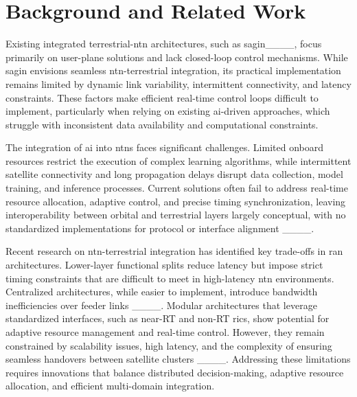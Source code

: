 \section{Background and Related Work}
\label{sec:background}

Existing integrated terrestrial-\gls{ntn} architectures, such as \gls{sagin}____, focus primarily on user-plane solutions and lack closed-loop control mechanisms. While \gls{sagin} envisions seamless \gls{ntn}-terrestrial integration, its practical implementation remains limited by dynamic link variability, intermittent connectivity, and latency constraints. These factors make efficient real-time control loops difficult to implement, particularly when relying on existing \gls{ai}-driven approaches, which struggle with inconsistent data availability and computational constraints.

The integration of \gls{ai} into \glspl{ntn} faces significant challenges. Limited onboard resources restrict the execution of complex learning algorithms, while intermittent satellite connectivity and long propagation delays disrupt data collection, model training, and inference processes. Current solutions often fail to address real-time resource allocation, adaptive control, and precise timing synchronization, leaving interoperability between orbital and terrestrial layers largely conceptual, with no standardized implementations for protocol or interface alignment ____.

Recent research on \gls{ntn}-terrestrial integration has identified key trade-offs in \gls{ran} architectures. Lower-layer functional splits reduce latency but impose strict timing constraints that are difficult to meet in high-latency \gls{ntn} environments. Centralized architectures, while easier to implement, introduce bandwidth inefficiencies over feeder links ____. Modular architectures that leverage standardized interfaces, such as near-RT and non-RT \glspl{ric}, show potential for adaptive resource management and real-time control. However, they remain constrained by scalability issues, high latency, and the complexity of ensuring seamless handovers between satellite clusters ____. Addressing these limitations requires innovations that balance distributed decision-making, adaptive resource allocation, and efficient multi-domain integration.

